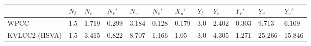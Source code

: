 \documentclass[review]{elsarticle}
\begin{document}
 \begin{savenotes}\sphinxattablestart
 \centering
 \sphinxthecaptionisattop
 \label{\detokenize{05.01_case_studies:intial-guess}}
 \sphinxaftertopcaption
 \begin{tabulary}{\linewidth}[t]{|T|T|T|T|T|T|T|T|T|T|T|T|}
 \hline
 \sphinxstyletheadfamily &\sphinxstyletheadfamily 
 
 \( N_{\delta} \)
 &\sphinxstyletheadfamily 
 
 \( N_{r} \)
 &\sphinxstyletheadfamily 
 
 \( N_{\dot{r}}' \)
 &\sphinxstyletheadfamily 
 
 \( N_{v} \)
 &\sphinxstyletheadfamily 
 
 \( N_{\dot{v}}' \)
 &\sphinxstyletheadfamily 
 
 \( X_{\dot{u}}' \)
 &\sphinxstyletheadfamily 
 
 \( Y_{\delta} \)
 &\sphinxstyletheadfamily 
 
 \( Y_{r} \)
 &\sphinxstyletheadfamily 
 
 \( Y_{\dot{r}}' \)
 &\sphinxstyletheadfamily 
 
 \( Y_{v} \)
 &\sphinxstyletheadfamily 
 
 \( Y_{\dot{v}}' \)
 \\
 \hline
 
 WPCC
 &
 
 \sphinxhyphen{}1.5
 &
 
 \sphinxhyphen{}1.719
 &
 
 \sphinxhyphen{}0.299
 &
 
 \sphinxhyphen{}3.184
 &
 
 \sphinxhyphen{}0.128
 &
 
 0.179
 &
 
 3.0
 &
 
 2.402
 &
 
 \sphinxhyphen{}0.303
 &
 
 \sphinxhyphen{}9.713
 &
 
 \sphinxhyphen{}6.109
 \\
 \hline
 
 KVLCC2 (HSVA)
 &
 
 \sphinxhyphen{}1.5
 &
 
 \sphinxhyphen{}3.415
 &
 
 \sphinxhyphen{}0.822
 &
 
 \sphinxhyphen{}8.707
 &
 
 \sphinxhyphen{}1.166
 &
 
 1.05
 &
 
 3.0
 &
 
 4.305
 &
 
 \sphinxhyphen{}1.271
 &
 
 \sphinxhyphen{}25.266
 &
 
 \sphinxhyphen{}15.846
 \\
 \hline
 \end{tabulary}
 \par
 \sphinxattableend\end{savenotes}
\end{document}
